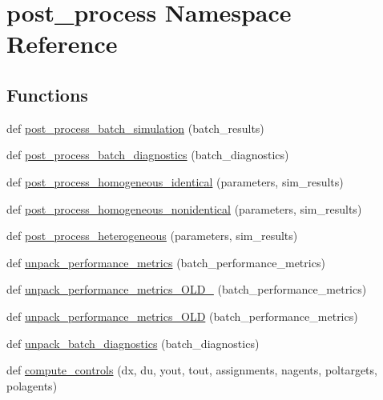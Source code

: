 \hypertarget{namespacepost__process}{}\section{post\+\_\+process Namespace Reference}
\label{namespacepost__process}
\subsection*{Functions}
\begin{DoxyCompactItemize}
\item 
def \mbox{\hyperlink{namespacepost__process_a2009d5938a8919bd33d7d274148e5263}{post\+\_\+process\+\_\+batch\+\_\+simulation}} (batch\+\_\+results)
\item 
def \mbox{\hyperlink{namespacepost__process_a5b319220652a268ee1dcbb710f38b420}{post\+\_\+process\+\_\+batch\+\_\+diagnostics}} (batch\+\_\+diagnostics)
\item 
def \mbox{\hyperlink{namespacepost__process_aed2ed4226d6805a549be6b3e9c9ec72d}{post\+\_\+process\+\_\+homogeneous\+\_\+identical}} (parameters, sim\+\_\+results)
\item 
def \mbox{\hyperlink{namespacepost__process_a11b9639a84b126d743bb26abe37ad8bc}{post\+\_\+process\+\_\+homogeneous\+\_\+nonidentical}} (parameters, sim\+\_\+results)
\item 
def \mbox{\hyperlink{namespacepost__process_a03fb7a7f49933480f1162e53995ca131}{post\+\_\+process\+\_\+heterogeneous}} (parameters, sim\+\_\+results)
\item 
def \mbox{\hyperlink{namespacepost__process_ac12d2839c57449ae1f8c071818ed5755}{unpack\+\_\+performance\+\_\+metrics}} (batch\+\_\+performance\+\_\+metrics)
\item 
def \mbox{\hyperlink{namespacepost__process_a5b5b5271b7f2487e85d72afcc40903e7}{unpack\+\_\+performance\+\_\+metrics\+\_\+\+O\+L\+D\+\_}} (batch\+\_\+performance\+\_\+metrics)
\item 
def \mbox{\hyperlink{namespacepost__process_ab8236930ba1c5b6ecb3de8daacd16a8c}{unpack\+\_\+performance\+\_\+metrics\+\_\+\+O\+LD}} (batch\+\_\+performance\+\_\+metrics)
\item 
def \mbox{\hyperlink{namespacepost__process_ac0513ae17e16904513842075429d02f1}{unpack\+\_\+batch\+\_\+diagnostics}} (batch\+\_\+diagnostics)
\item 
def \mbox{\hyperlink{namespacepost__process_a1b8d2e30b28ec59e357e3b79a4deccca}{compute\+\_\+controls}} (dx, du, yout, tout, assignments, nagents, poltargets, polagents)

\end{DoxyCompactItemize}
